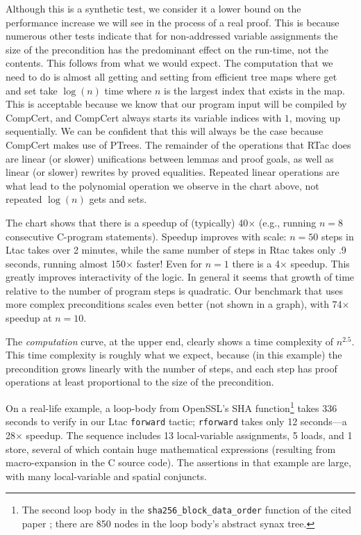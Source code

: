\documentclass{puthesis}
\begin{document}
Although this is a synthetic test, we consider
it a lower bound on the performance increase we will see in the
process of a real proof. This is because numerous other tests
indicate that for non-addressed variable assignments the size of the
precondition has the predominant effect on the run-time, not the
contents. This follows from what we would expect. The computation that
we need to do is almost all getting and setting from efficient tree
maps where get and set take $\log(n)$ time where $n$ is the largest
index that exists in the map. This is acceptable because we know that
our program input will be compiled by CompCert, and CompCert always
starts its variable indices with $1$, moving up sequentially. We can
be confident that this will always be the case because CompCert makes
use of PTrees. The remainder of the operations that RTac does are
linear (or slower) unifications between lemmas and proof goals, as
well as linear (or slower) rewrites by proved equalities. Repeated
linear operations are what lead to the polynomial operation we observe in
the chart above, not repeated $\log(n)$ gets and sets. 

The chart shows that there 
is a speedup of (typically) 40$\times$ (e.g., running $n\! = \! 8$ consecutive
C-program statements). 
Speedup improves with scale: $n\! =\! 50$ 
steps in Ltac takes over 2 minutes, while
the same number of steps in Rtac takes only .9 seconds, running almost 150$\times$ faster! 
Even for $n\!=\!1$ there is a 4$\times$ speedup.
This greatly improves interactivity of the logic. In general it
seems that growth of time relative to the number of program steps is
quadratic. Our benchmark that uses more complex preconditions
scales even better (not shown in a graph),
with 74$\times$ speedup at $n\! = \!10$.


The \emph{computation} curve, at the upper end, clearly
shows a time complexity of $n^{2.5}$.
This time complexity is roughly what we expect,
because (in this example) the
precondition grows linearly with the number of steps,
and each step has proof operations at least proportional to the size
of the precondition.



On a real-life example, a loop-body from 
OpenSSL's SHA function\footnote{The second loop body in
the \lstinline{sha256_block_data_order} function of the cited paper \cite{appel15:sha}; there are 850 nodes in the loop body's abstract synax tree.} 
takes 336 seconds to verify in our Ltac \lstinline{forward} tactic;
\lstinline|rforward| takes only 12 seconds---a 28$\times$ speedup. The sequence
includes 13 local-variable assignments,
5 loads, and 1 store, several of which contain 
huge mathematical expressions (resulting from macro-expansion in the
C source code). The assertions in that example
are large, with many local-variable and
spatial conjuncts.
\end{document}
